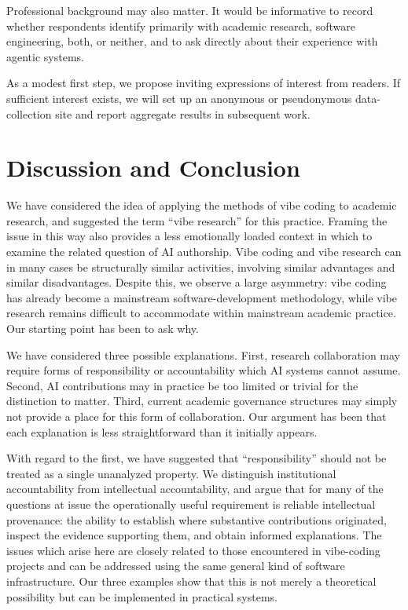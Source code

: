 \documentclass[12pt]{article}
\begin{document}
Professional background may also matter. It would be informative to record whether respondents identify primarily with academic research, software engineering, both, or neither, and to ask directly about their experience with agentic systems.

As a modest first step, we propose inviting expressions of interest from readers. If sufficient interest exists, we will set up an anonymous or pseudonymous data-collection site and report aggregate results in subsequent work.

\section{Discussion and Conclusion}

We have considered the idea of applying the methods of vibe coding to academic research, and suggested the term ``vibe research'' for this practice. Framing the issue in this way also provides a less emotionally loaded context in which to examine the related question of AI authorship. Vibe coding and vibe research can in many cases be structurally similar activities, involving similar advantages and similar disadvantages. Despite this, we observe a large asymmetry: vibe coding has already become a mainstream software-development methodology, while vibe research remains difficult to accommodate within mainstream academic practice. Our starting point has been to ask why.

We have considered three possible explanations. First, research collaboration may require forms of responsibility or accountability which AI systems cannot assume. Second, AI contributions may in practice be too limited or trivial for the distinction to matter. Third, current academic governance structures may simply not provide a place for this form of collaboration. Our argument has been that each explanation is less straightforward than it initially appears.

With regard to the first, we have suggested that ``responsibility'' should not be treated as a single unanalyzed property. We distinguish institutional accountability from intellectual accountability, and argue that for many of the questions at issue the operationally useful requirement is reliable intellectual provenance: the ability to establish where substantive contributions originated, inspect the evidence supporting them, and obtain informed explanations. The issues which arise here are closely related to those encountered in vibe-coding projects and can be addressed using the same general kind of software infrastructure. Our three examples show that this is not merely a theoretical possibility but can be implemented in practical systems.
\end{document}
